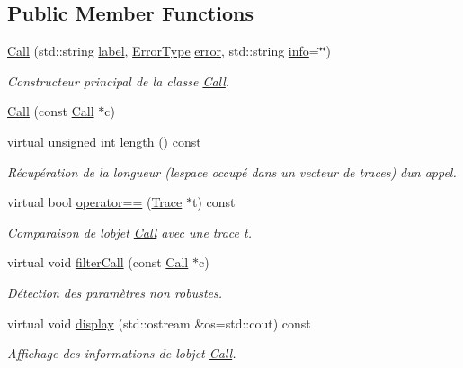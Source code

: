 \subsection*{Public Member Functions}
\begin{DoxyCompactItemize}
\item 
\hyperlink{class_call_a5c9ce1d9165652dfc34a0a471a036c5e}{Call} (std\+::string \hyperlink{class_call_ad6b8343d530798fdb48407b3f2489ae7}{label}, \hyperlink{class_call_ade833a08ce215aaa4121102f3448c898}{Error\+Type} \hyperlink{class_call_a206f6150a8038fda48c17c2c7421aed1}{error}, std\+::string \hyperlink{class_trace_a4835dcfa7da5d4c971e8f7d6860acb09}{info}=\char`\"{}\char`\"{})
\begin{DoxyCompactList}\small\item\em Constructeur principal de la classe \hyperlink{class_call}{Call}. \end{DoxyCompactList}\item 
\hyperlink{class_call_ac67647d4a7daa45d0dcd5f971f376fc6}{Call} (const \hyperlink{class_call}{Call} $\ast$c)
\item 
virtual unsigned int \hyperlink{class_call_ac94d8a7498716a0131a731963f035905}{length} () const 
\begin{DoxyCompactList}\small\item\em Récupération de la longueur (l\textquotesingle{}espace occupé dans un vecteur de traces) d\textquotesingle{}un appel. \end{DoxyCompactList}\item 
virtual bool \hyperlink{class_call_a63f6986cf6a599a25705cf05687f6412}{operator==} (\hyperlink{class_trace}{Trace} $\ast$t) const 
\begin{DoxyCompactList}\small\item\em Comparaison de l\textquotesingle{}objet \hyperlink{class_call}{Call} avec une trace {\ttfamily t}. \end{DoxyCompactList}\item 
virtual void \hyperlink{class_call_a9fa2498f2e58dd9efe627a69dfdfb7f0}{filter\+Call} (const \hyperlink{class_call}{Call} $\ast$c)
\begin{DoxyCompactList}\small\item\em Détection des paramètres non robustes. \end{DoxyCompactList}\item 
virtual void \hyperlink{class_call_a397f37a434fc1b186ea3460d0c21ff43}{display} (std\+::ostream \&os=std\+::cout) const 
\begin{DoxyCompactList}\small\item\em Affichage des informations de l\textquotesingle{}objet \hyperlink{class_call}{Call}. \end{DoxyCompactList}\item 

\end{DoxyCompactItemize}
